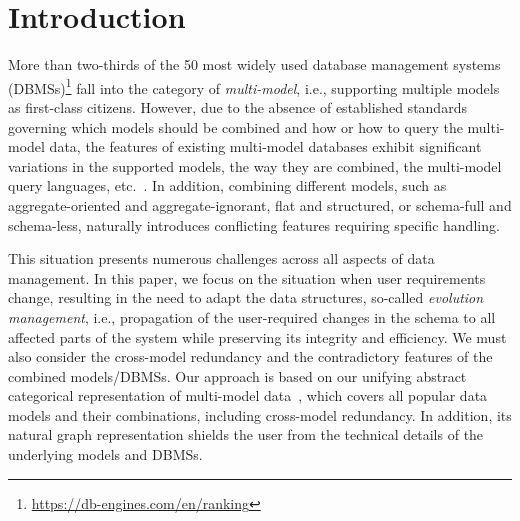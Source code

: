 
\section{Introduction}

More than two-thirds of the 50 most widely used database management systems (DBMSs)\footnote{\url{https://db-engines.com/en/ranking}} fall into the category of \textit{multi-model}, i.e., supporting multiple models as first-class citizens.
However, due to the absence of established standards governing which models should be combined and how or how to query the multi-model data, the features of existing multi-model databases exhibit significant variations in the supported models, the way they are combined, the multi-model query languages, etc.~\citep{CSUR-Jiaheng}. In addition, combining different models, such as aggregate-oriented and aggregate-ignorant, flat and structured, or schema-full and schema-less, naturally introduces conflicting features requiring specific handling.

This situation presents numerous challenges across all aspects of data management. In this paper, we focus on the situation when user requirements change, resulting in the need to adapt the data structures, so-called \textit{evolution management}, i.e., propagation of the user-required changes in the schema to all affected parts of the system while preserving its integrity and efficiency.
We must also consider the cross-model redundancy and the contradictory features of the combined models/DBMSs. Our approach is based on our unifying abstract categorical representation of multi-model data~\citep{mm_cat_journal}, which covers all popular data models and their combinations, including cross-model redundancy. In addition, its natural graph representation shields the user from the technical details of the underlying models and DBMSs.

